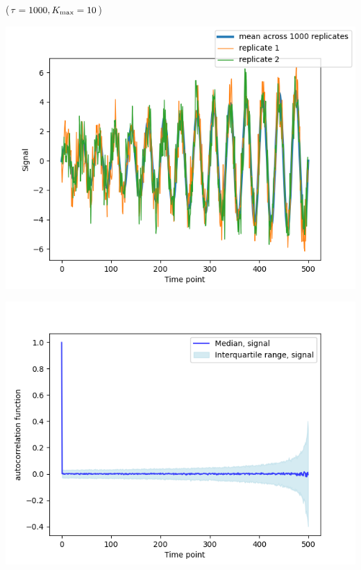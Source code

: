 \begin{enumerate}
\begin{enumerate}
\begin{enumerate}
(\(\tau = 1000, K_{\rm{max}} = 10\))
\begin{center}
\includegraphics[width=.9\linewidth]{nonstat_tau1000_samephase_1000rep_mean.png}
\end{center}
\begin{center}
\includegraphics[width=.9\linewidth]{nonstat_tau1000_samephase_1000rep_acf.png}
\end{center}


\end{enumerate}
\end{enumerate}
\end{enumerate}
